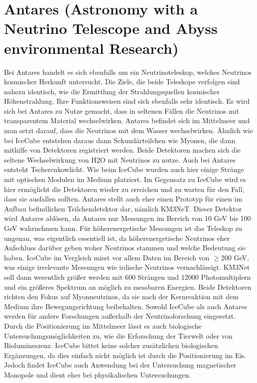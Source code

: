     \section{Antares (Astronomy with a Neutrino Telescope and Abyss environmental Research)}

    Bei Antares handelt es sich ebenfalls um ein Neutrinoteleskop, welches Neutrinos kosmischer Herkunft 
    untersucht. Die Ziele, die beide Teleskope verfolgen sind nahezu identisch, wie die Ermittlung der 
    Strahlungsquellen kosmischer Höhenstrahlung. Ihre Funktionsweisen sind sich ebenfalls sehr identisch. 
    Es wird sich bei Antares zu Nutze gemacht, dass in seltenen Fällen die Neutrinos mit transparentem 
    Material wechselwirken. Antares befindet sich im Mittelmeer und man setzt darauf, dass die Neutrinos 
    mit dem Wasser wechselwirken. Ähnlich wie bei IceCube entstehen daraus dann Sekundärteilchen wie Myonen, 
    die dann mithilfe von Detektoren registriert werden. Beide Detektoren machen sich die seltene 
    Wechselwirkung von H2O mit Neutrinos zu nutze. Auch bei Antares entsteht Tscherenkowlicht. 
    Wie beim IceCube wurden auch hier einige Stränge mit optischen Modulen im Medium platziert. 
    Im Gegensatz zu IceCube wird es hier ermöglicht die Detektoren wieder zu erreichen und zu warten für den 
    Fall, dass sie ausfallen sollten. Antares stellt auch eher einen Prototyp für einen im Aufbau befindlichen 
    Teilchendetektor dar, nämlich KM3NeT. Dieser Detektor wird Antares ablösen, da Antares nur Messungen im 
    Bereich von 10 GeV bis 100 GeV wahrnehmen kann. Für höherenergetische Messungen ist das Teleskop zu 
    ungenau, was eigentlich essentiell ist, da höherenergetische Neutrinos eher Aufschluss darüber geben 
    woher Neutrinos stammen und welche Bedeutung sie haben. IceCube im Vergleich misst vor allem Daten im 
    Bereich von $\geq$200 GeV, was einige irrelevante Messungen wie irdische Neutrinos vernachlässigt. KM3Net 
    soll dann wesentlich größer werden mit 600 Strängen und 12000 Photomultiplern und ein größeres Spektrum 
    an möglich zu messbaren Energien. Beide Detektoren richten den Fokus auf Myonneutrinos, da sie nach 
    der Kernreaktion mit dem Medium ihre Bewegungsrichtung beibehalten. Sowohl IceCube als auch Antares 
    werden für andere Forschungen außerhalb der Neutrinoforschung eingesetzt. Durch die Positionierung 
    im Mittelmeer lässt es auch biologische Untersuchungsmöglichkeiten zu, wie die Erforschung der 
    Tierwelt oder von Biolumineszenz. IceCube bittet keine solcher zusätzlichen biologischen Ergänzungen, 
    da dies einfach nicht möglich ist durch die Positionierung im Eis. Jedoch findet IceCube auch Anwendung 
    bei der Untersuchung magnetischer Monopole und dient eher bei physikalischen Untersuchungen. \cite{AntOV13}

